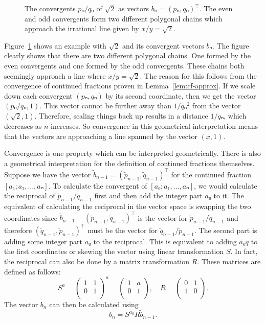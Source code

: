 \begin{figure}[tb]
  \centering
  
  \caption{
    The convergents $pₙ/qₙ$ of $\sqrt{2}$ as vectors $bₙ = (pₙ, qₙ)^⊤$.
    The even and odd convergents form two different polygonal chains which
    approach the irrational line given by $x/y = \sqrt{2}$.
  }
  \label{fig:klein-polygon}
\end{figure}

Figure~\ref{fig:klein-polygon} shows an example with $\sqrt{2}$ and its convergent vectors $bₙ$.
The figure clearly shows that there are two different polygonal chains.
One formed by the even convergents and one formed by the odd convergents.
These chains both seemingly approach a line where $x/y = \sqrt{2}$.
The reason for this follows from the convergence of continued fractions proven in Lemma~\ref{lem:cf-approx}.
If we scale down each convergent $(pₙ, qₙ)$ by its second coordinate,
then we get the vector $(pₙ/qₙ, 1)$.
This vector cannot be further away than $1/qₙ^2$ from the vector $(\sqrt{2}, 1)$.
Therefore, scaling things back up results in a distance $1/qₙ$, which decreases as $n$ increases.
So convergence in this geometrical interpretation means that the vectors are
approaching a line spanned by the vector $(x, 1)$.

Convergence is one property which can be interpreted geometrically.
There is also a geometrical interpretation for the definition of continued fractions themselves.
Suppose we have the vector $\tilde b_{n-1} = (\tilde p_{n-1}, \tilde q_{n-1})^⊤$
for the continued fraction $[a₁; a₂, …, aₙ]$.
To calculate the convergent of $[a₀; a₁, …, aₙ]$,
we would calculate the reciprocal of $\tilde p_{n-1} / \tilde q_{n-1}$ first
and then add the integer part $a₀$ to it.
The equivalent of calculating the reciprocal in the vector space is swapping the two coordinates
since $\tilde b_{n-1} = (\tilde p_{n-1}, \tilde q_{n-1})^⊤$ is the vector for $\tilde p_{n-1} / \tilde q_{n-1}$
and therefore $(\tilde q_{n-1}, \tilde p_{n-1})^⊤$ must be the vector for $\tilde q_{n-1} / \tilde p_{n-1}$.
The second part is adding some integer part $a₀$ to the reciprocal.
This is equivalent to adding $a₀ q$ to the first coordinates
or skewing the vector using linear transformation $S$.
In fact, the reciprocal can also be done by a matrix transformation $R$.
These matrices are defined as follows:
\[
  S^a =
  \begin{pmatrix}
    1 & 1 \\
    0 & 1 \\
  \end{pmatrix}^a
  =
  \begin{pmatrix}
    1 & a \\
    0 & 1 \\
  \end{pmatrix},
  \quad
  R =
  \begin{pmatrix}
    0 & 1 \\
    1 & 0 \\
  \end{pmatrix}.
\]
The vector $b_n$ can then be calculated using
\[
  b_n = S^{a_0} R \tilde b_{n-1}.
\]

